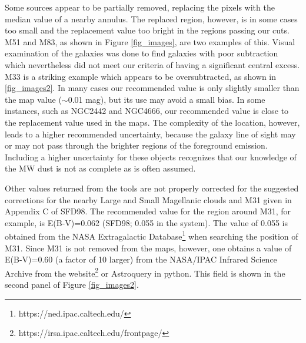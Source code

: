 \documentclass[twocolumn]{aastex63}
\begin{document}
Some sources appear to be partially removed, replacing the pixels with the median value of a nearby annulus.  The replaced region, however, is in some cases too small and the replacement value too bright in the regions passing our cuts.  M51 and M83, as shown in Figure \ref{fig_images}, are two examples of this.
Visual examination of the \citet{Rice_etal_1988} galaxies was done to find galaxies with poor subtraction which nevertheless did not meet our criteria of having a significant central excess.  M33 is a striking example which appears to be oversubtracted, as shown in \ref{fig_images2}.  In many cases our recommended value is only slightly smaller than the map value ($\sim$0.01 mag), but its use may avoid a small bias.  In some instances, such as NGC2442 and NGC4666, our recommended value is close to the replacement value used in the maps.  The complexity of the location, however, leads to a higher recommended uncertainty, because the galaxy line of sight may or may not pass through the brighter regions of the foreground emission.  Including a higher uncertainty for these objects recognizes that our knowledge of the MW dust is not as complete as is often assumed.

Other values returned from the tools are not properly corrected for the suggested corrections for the nearby Large and Small Magellanic clouds and M31 given in Appendix C of SFD98.  
The recommended value for the region around M31, for example, is E(B-V)=0.062 (SFD98; 0.055 in the \citealp{Schlafly_Finkbeiner_2011} system).  The \citet{Schlafly_Finkbeiner_2011} value of 0.055 is obtained from the NASA Extragalactic Database\footnote{https://ned.ipac.caltech.edu/} when searching the position of M31.  Since M31 is not removed from the maps, however, one obtains a value of E(B-V)=0.60 (a factor of 10 larger) from the NASA/IPAC Infrared Science Archive from the website\footnote{https://irsa.ipac.caltech.edu/frontpage/} or Astroquery in python.  This field is shown in the second panel of Figure \ref{fig_images2}.
\end{document}

